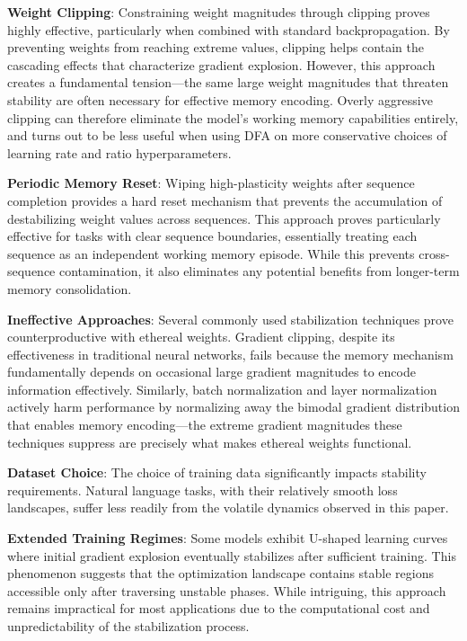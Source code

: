 \documentclass{article} %
\begin{document}
\textbf{Weight Clipping}: Constraining weight magnitudes through clipping proves highly effective, particularly when combined with standard backpropagation. By preventing weights from reaching extreme values, clipping helps contain the cascading effects that characterize gradient explosion. However, this approach creates a fundamental tension—the same large weight magnitudes that threaten stability are often necessary for effective memory encoding. Overly aggressive clipping can therefore eliminate the model's working memory capabilities entirely, and turns out to be less useful when using DFA on more conservative choices of learning rate and ratio hyperparameters.

\textbf{Periodic Memory Reset}: Wiping high-plasticity weights after sequence completion provides a hard reset mechanism that prevents the accumulation of destabilizing weight values across sequences. This approach proves particularly effective for tasks with clear sequence boundaries, essentially treating each sequence as an independent working memory episode. While this prevents cross-sequence contamination, it also eliminates any potential benefits from longer-term memory consolidation.

\textbf{Ineffective Approaches}: Several commonly used stabilization techniques prove counterproductive with ethereal weights. Gradient clipping, despite its effectiveness in traditional neural networks, fails because the memory mechanism fundamentally depends on occasional large gradient magnitudes to encode information effectively. Similarly, batch normalization and layer normalization actively harm performance by normalizing away the bimodal gradient distribution that enables memory encoding—the extreme gradient magnitudes these techniques suppress are precisely what makes ethereal weights functional.

\textbf{Dataset Choice}: The choice of training data significantly impacts stability requirements. Natural language tasks, with their relatively smooth loss landscapes, suffer less readily from the volatile dynamics observed in this paper. 

\textbf{Extended Training Regimes}: Some models exhibit U-shaped learning curves where initial gradient explosion eventually stabilizes after sufficient training. This phenomenon suggests that the optimization landscape contains stable regions accessible only after traversing unstable phases. While intriguing, this approach remains impractical for most applications due to the computational cost and unpredictability of the stabilization process.
\end{document}
